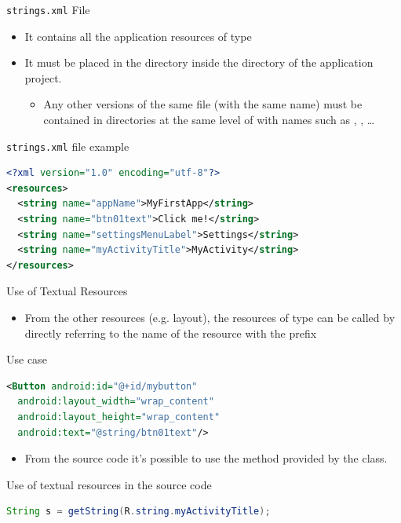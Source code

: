 \documentclass{beamer}
\begin{document}
  \begin{frame}[fragile]{\texttt{strings.xml} File}
    \begin{itemize}
      \item It contains all the application resources of type 
      \item It must be placed in the  directory inside the
       directory of the application project.
      \begin{itemize}
        \item Any other versions of the same file (with the same name) must be
        contained in directories at the same level of  with names such as
        , , \dots
      \end{itemize}
    \end{itemize}

    \begin{exampleblock}{\texttt{strings.xml} file example}
      \begin{lstlisting}[language=XML]  		        
<?xml version="1.0" encoding="utf-8"?>
<resources>
  <string name="appName">MyFirstApp</string>
  <string name="btn01text">Click me!</string>
  <string name="settingsMenuLabel">Settings</string>
  <string name="myActivityTitle">MyActivity</string>
</resources>
      \end{lstlisting}
    \end{exampleblock}
  \end{frame}

  \begin{frame}[fragile]{Use of Textual Resources}
    \begin{itemize}
      \item From the other resources (e.g. layout), the resources of type
       can be called by directly referring to the name of the
      resource with the prefix 
    \end{itemize}
    \begin{exampleblock}{Use case}
      \begin{lstlisting}[language=XML]  		        
<Button android:id="@+id/mybutton"
  android:layout_width="wrap_content"
  android:layout_height="wrap_content"
  android:text="@string/btn01text"/>
      \end{lstlisting}
    \end{exampleblock}
    \begin{itemize}
      \item From the source code it's possible to use the  method provided by the  class. 
    \end{itemize}
    \begin{exampleblock}{Use of textual resources in the source code}
      \begin{lstlisting}[language=Java]  		        
String s = getString(R.string.myActivityTitle);
      \end{lstlisting}
    \end{exampleblock}
  \end{frame}
\end{document}
